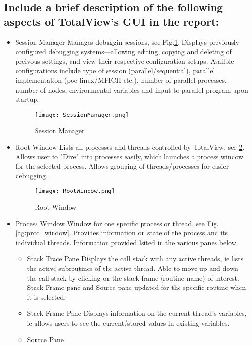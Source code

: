 \documentclass{article}
\begin{document}
\subsection{Include a brief description of the following aspects of TotalView’s GUI in the report:}
\begin{itemize}
	\item Session Manager
	Manages debuggin sessions, see Fig.\ref{fig:sess_manager}. Displays previously configured debugging systems---allowing editing, copying and deleting of preivous settings, and view their respective configuration setups. Availble configurations include type of session (parallel/sequential), parallel implementation (poe-linux/MPICH etc.), number of parallel processes, number of nodes, environmental variables and input to parallel program upon startup.
	\begin{figure}[p] %
			\texttt{[image: SessionManager.png]}
		\caption{Session Manager}
		\label{fig:sess_manager}
	\end{figure}
	\item Root Window
	Lists all processes and threads controlled by TotalView, see \ref{fig:root_window}. Allows user to "Dive" into processes easily, which launches a process window for the selected process. Allows grouping of threads/processes for easier debugging.
		\begin{figure}[p] %
			\texttt{[image: RootWindow.png]}
		\caption{Root Window}
		\label{fig:root_window}
	\end{figure}
	\item Process Window
	Window for one specific process or thread, see Fig. \ref{fig:proc_window}. Provides information on state of the process and its individual threads. Information provided lsited in the various panes below.
	\begin{itemize}
		\item Stack Trace Pane
		Displays the call stack with any active threads, ie lists the active subroutines of the active thread. Able to move up and down the call stack by clicking on the stack frame (routine name) of interest. Stack Frame pane and Source pane updated for the specific routine when it is selected.
		\item Stack Frame Pane
		Displays information on the current thread's variables, ie allows users to see the current/stored values in existing variables.
		\item Source Pane

\end{itemize}
\end{itemize}
\end{document}
